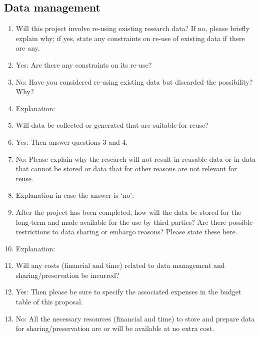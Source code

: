 \newpage
\subsection{Data management}\label{sec:dataman}


\begin{enumerate}
	\item Will this project involve re-using existing research data? If no, please briefly explain why; if yes, state any constraints on re-use of existing data if there are any.  
	\item[] \checkbox[1em] Yes: Are there any constraints on its re-use?
	\item[] \checkedbox[1em] No: Have you considered re-using existing data but discarded the possibility? Why?
	\vspace{6pt}
	\item[]Explanation:
	\vspace{6pt}
	
    \item Will data be collected or generated that are suitable for reuse?
    \item[] \checkedbox[1em] Yes: Then answer questions 3 and 4.
    \item[] \checkbox[1em] No: Please explain why the research will not result in reusable data or in data that cannot be stored or data that for other reasons are not relevant for reuse.
    \vspace{6pt}
    \item[]Explanation in case the answer is `no':
    \vspace{6pt}

    \item After the project has been completed, how will the data be stored for the long-term and made available for the use by third parties? Are there possible restrictions to data sharing or embargo reasons? Please state these here.
    \vspace{6pt}
    \item[] Explanation:
    \vspace{6pt}

    \item Will any costs (financial and time) related to data management and sharing/preservation be incurred?
	\item[] \checkbox[1em] Yes: Then please be sure to specify the associated expenses in the budget table of this proposal.
	\item[] \checkedbox[1em] No: All the necessary resources (financial and time) to store and prepare data for sharing/preservation are or will be available at no extra cost.
\end{enumerate}


